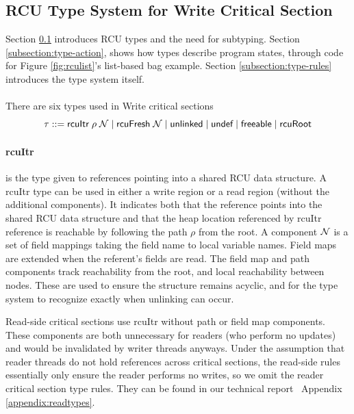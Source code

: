 \subsection{\textsf{RCU} Type System for \textsf{Write} Critical Section}
\label{subsection:rcu-typing}
Section \ref{subsection:rcu-typing} introduces \textsf{RCU} types and the need for subtyping. Section \ref{subsection:type-action}, shows how types describe program states, through code for Figure \ref{fig:rculist}'s list-based bag example. Section \ref{subsection:type-rules} introduces the type system itself.
\paragraph{}
\label{subsection:typwrt}
There are six types used in \textsf{Write} critical sections
\[
\tau ::=  \textsf{rcuItr}\;\rho\;\mathcal{N} \mid \textsf{rcuFresh}\;\mathcal{N}  \mid \textsf{unlinked} \mid \textsf{undef} \mid \textsf{freeable}
\mid \textsf{rcuRoot}\]
\paragraph{rcuItr} is the type given to references pointing into a shared RCU data structure. A \textsf{rcuItr} type can be used in either a write region or a read region (without the additional components). It indicates both that the reference points into the shared \textsf{RCU} data structure and that the heap location referenced by \textsf{rcuItr} reference is reachable by following the path $\rho$ from the root. A component $\mathcal{N}$ is a set of field mappings taking the field name to local variable names. Field maps are extended when the referent's fields are read.
The field map and path components track reachability from the root, and local reachability between nodes.  These are used to ensure the structure remains acyclic, and for the type system to recognize exactly when unlinking can occur.

Read-side critical sections use \textsf{rcuItr} without path or field map components.  These components are both unnecessary for readers (who perform no updates) and would be invalidated by writer threads anyways.
Under the assumption that reader threads do not hold references across critical sections, the read-side rules essentially only ensure the reader performs no writes, so we omit the reader critical section type rules. They can be found in our technical report~\cite{isotek} Appendix \ref{appendix:readtypes}.
